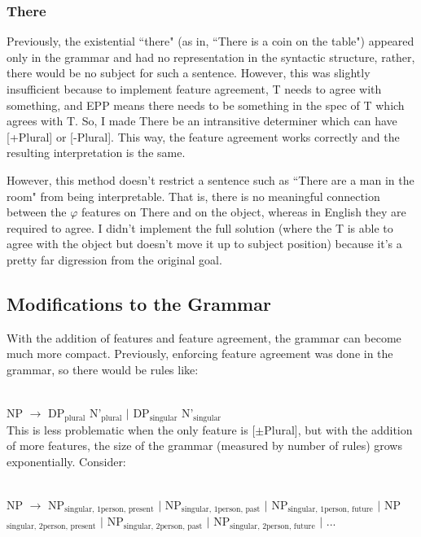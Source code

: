 \documentclass[11pt]{article}
\begin{document}
\subsubsection{There}
Previously, the existential ``there" (as in, ``There is a coin on the table") appeared only in the
grammar and had no representation in the syntactic structure, rather, there would be no subject
for such a sentence. However, this was slightly insufficient because to implement feature agreement,
T needs to agree with something, and EPP means there needs to be something in the spec of T which
agrees with T. So, I made There be an intransitive determiner which can have [+Plural] or [-Plural].
This way, the feature agreement works correctly and the resulting interpretation is the same.

However, this method doesn't restrict a sentence such as ``There are a man in the room" from being
interpretable. That is, there is no meaningful connection between the $\varphi$ features on There and
on the object, whereas in English they are required to agree. I didn't implement
the full solution (where the T is able to agree with the object but doesn't move it up to subject
position) because it's a pretty far digression from the original goal.

\subsection{Modifications to the Grammar}
With the addition of features and feature agreement, the grammar can become much more compact.
Previously, enforcing feature agreement was done in the grammar, so there would be rules like:

\ \\
\indent NP $\rightarrow$ DP$_{\text{plural}}$ N'$_{\text{plural}}$ $\vert$ DP$_{\text{singular}}$ N'$_{\text{singular}}$
\ \\

This is less problematic when the only feature is [$\pm$Plural], but with the addition of more features, the
size of the grammar (measured by number of rules) grows exponentially. Consider:

\ \\
\indent NP $\rightarrow$ NP$_{\text{singular, 1person, present}}$ $\vert$ NP$_{\text{singular, 1person, past}}$ $\vert$ NP$_{\text{singular, 1person, future}}$ $\vert$ NP$_{\text{singular, 2person, present}}$ $\vert$ NP$_{\text{singular, 2person, past}}$ $\vert$ NP$_{\text{singular, 2person, future}}$ $\vert$ ...
\ \\
\end{document}

